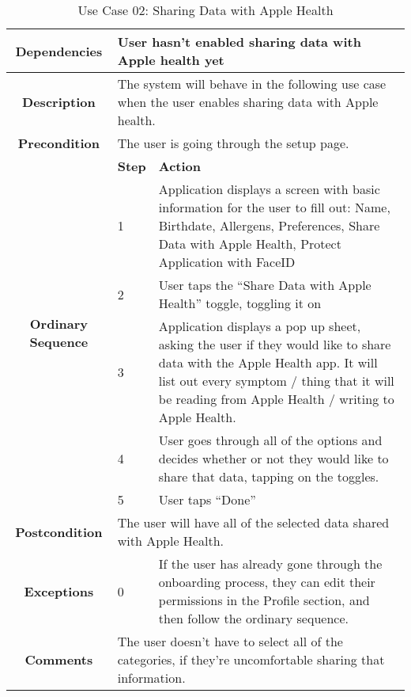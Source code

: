 \begin{table}[ht]
\centering
\caption{Use Case 02: Sharing Data with Apple Health}

\hspace{1em}
\renewcommand{\arraystretch}{1.7}

\begin{tabular}{|c|p{2em}|p{14cm}|}
\hline
\textbf{Dependencies} & \multicolumn{2}{|p{14cm}|}{User hasn’t enabled sharing data with Apple health yet} \\ 
\hline
\textbf{Description} & \multicolumn{2}{|p{14cm}|}{The system will behave in the following use case when the user enables sharing data with Apple health.} \\
\hline
\textbf{Precondition} & \multicolumn{2}{|p{14cm}|}{The user is going through the setup page.} \\
\hline
\multirow{6}{4em}{\textbf{Ordinary Sequence}} & \textbf{Step} & \textbf{Action} \\
& 1 & Application displays a screen with basic information for the user to fill out: Name, Birthdate, Allergens, Preferences, Share Data with Apple Health, Protect Application with FaceID \\
& 2 & User taps the “Share Data with Apple Health” toggle, toggling it on \\
& 3 & Application displays a pop up sheet, asking the user if they would like to share data with the Apple Health app. It will list out every symptom / thing that it will be reading from Apple Health / writing to Apple Health. \\
& 4 & User goes through all of the options and decides whether or not they would like to share that data, tapping on the toggles. \\
& 5 & User taps “Done” \\
\hline
\textbf{Postcondition} & \multicolumn{2}{|p{14cm}|}{The user will have all of the selected data shared with Apple Health.} \\
\hline
\textbf{Exceptions} & 0 & If the user has already gone through the onboarding process, they can edit their permissions in the Profile section, and then follow the ordinary sequence. \\
\hline
\textbf{Comments} & \multicolumn{2}{|p{14cm}|}{The user doesn’t have to select all of the categories, if they’re uncomfortable sharing that information.} \\
\hline
\end{tabular}
\end{table}
